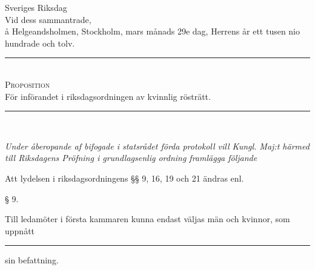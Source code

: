 \documentclass[a4paper]{article}
\renewcommand{\section}[1]{\begin{center}§ #1.\end{center}}
\begin{document}
{\centering

        {\calfamily
                {\Huge Sveriges Riksdag}\\
                {\Large Vid dess sammantrade,}\\ %
        }
        å Helgeandsholmen, Stockholm, mars månads 29e dag, Herrens år ett tusen
        nio hundrade och tolv.\\[0.5cm]

        \rule{5cm}{0.2ex}\\[0.5cm]
        {\large\scshape Proposition}\\
        För införandet i riksdagsordningen av kvinnlig rösträtt.\\[0.5cm]
        \rule{5cm}{0.2ex}\\[0.5cm]
}

{\itshape
        Under åberopande af bifogade i statsrådet förda protokoll vill Kungl.
        Maj:t härmed till Riksdagens Pröfning i grundlagsenlig ordning
        framlägga följande
}

Att lydelsen i riksdagsordningens §§ 9, 16, 19 och 21 ändras enl.

\section{9}
Till ledamöter i första kammaren kunna endast väljas män och kvinnor, som
uppnått  \rule[0.5ex]{2cm}{0.2ex} sin befattning.
\end{document}
